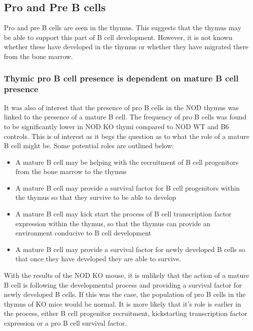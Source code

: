 


\subsection{Pro and Pre B cells}
Pro and pre B cells are seen in the thymus.
This suggests that the thymus may be able to support this part of B cell development.
However, it is not known whether these have developed in the thymus or whether they have migrated there from the bone marrow.

\subsubsection{Thymic pro B cell presence is dependent on mature B cell presence}

It was also of interest that the presence of pro B cells in the NOD thymus was linked to the presence of a mature B cell.
The frequency of pro B cells was found to be significantly lower in NOD KO thymi compared to NOD WT and B6 controls.
This is of interest as it begs the question as to what the role of a mature B cell might be.
Some potential roles are outlined below:
\begin{itemize}
\item A mature B cell may be helping with the recruitment of B cell progenitors from the bone marrow to the thymus
\item A mature B cell may provide a survival factor for B cell progenitors within the thymus so that they survive to be able to develop
\item A mature B cell may kick start the process of B cell transcription factor expression within the thymus, so that the thymus can provide an environment conducive to B cell development
\item A mature B cell may provide a survival factor for newly developed B cells so that once they have developed they are able to survive.
\end{itemize}

With the results of the NOD KO mouse, it is unlikely that the action of a mature B cell is following the developmental process and providing a survival factor for newly developed B cells.
If this was the case, the population of pro B cells in the thymus of KO mice would be normal.
It is more likely that it's role is earlier in the process, either B cell progenitor recruitment, kickstarting transcription factor expression or a pro B cell survival factor.

